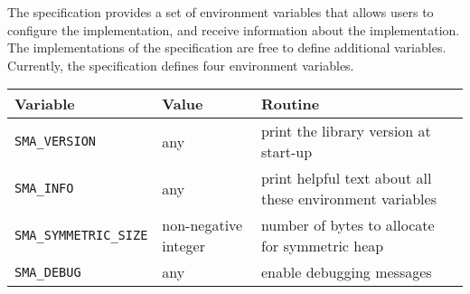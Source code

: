 The \openshmem specification provides a set of environment variables that allows
users to configure the \openshmem implementation, and receive information about
the implementation. The implementations of the specification are free to define
additional variables. Currently, the specification defines four environment
variables.

\medskip{}

\begin{tabular}{|l|l|l|}
\hline 
Variable & Value & Routine\tabularnewline
\hline 
\hline 
\texttt{SMA\_VERSION} & any & print the library version at
start-up\tabularnewline
\hline 
\texttt{SMA\_INFO} & any & print helpful text about all these environment
variables\tabularnewline
\hline 
\texttt{SMA\_SYMMETRIC\_SIZE} & non-negative integer & number of bytes to
allocate for symmetric heap\tabularnewline
\hline 
\texttt{SMA\_DEBUG} & any & enable debugging messages\tabularnewline
\hline 
\end{tabular}

\medskip{}
